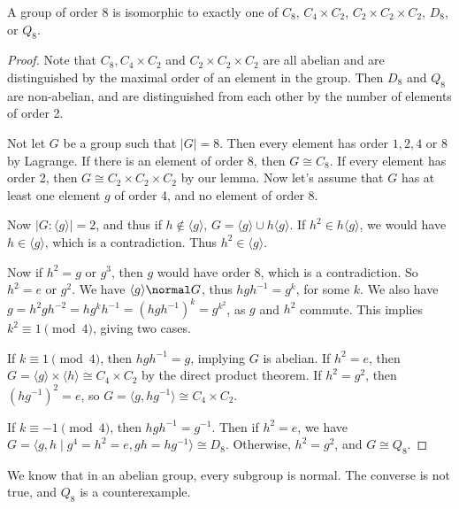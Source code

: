 \documentclass[a4]{scrreprt}
\begin{document}
\begin{theorem}
	A group of order 8 is isomorphic to exactly one of $C_8$, $C_4 \times C_2$, $C_2 \times C_2 \times C_2$, $D_8$, or $Q_8$.
\end{theorem}
\begin{proof}
	Note that $C_8, C_4 \times C_2$ and $C_2 \times C_2 \times C_2$ are all abelian and are distinguished by the maximal order of an element in the group. Then $D_8$ and $Q_8$ are non-abelian, and are distinguished from each other by the number of elements of order 2.

	Not let $G$ be a group such that $|G| = 8$. Then every element has order $1, 2, 4$ or $8$ by Lagrange. If there is an element of order 8, then $G \cong C_8$. If every element has order 2, then $G \cong C_2 \times C_2 \times C_2$ by our lemma. Now let's assume that $G$ has at least one element $g$ of order 4, and no element of order 8.

	Now $|G : \langle g \rangle| = 2$, and thus if $h \not \in \langle g \rangle$, $G = \langle g \rangle \cup h \langle g \rangle$. If $h^2 \in h \langle g \rangle$, we would have $h \in \langle g \rangle$, which is a contradiction. Thus $h^2 \in \langle g \rangle$.

	Now if $h^2 = g$ or $g^3$, then $g$ would have order 8, which is a contradiction. So $h^2 = e$ or $g^2$.
	We have $\langle g \rangle \normal G$, thus $hgh^{-1} = g^k$, for some $k$. We also have $g = h^2 g h^{-2} = h g^{k} h^{-1} = (hgh^{-1})^k = g^{k^2}$, as $g$ and $h^2$ commute. 
	This implies $k^2 \equiv 1 \pmod{4}$, giving two cases.

	If $k \equiv 1 \pmod{4}$, then $hgh^{-1} = g$, implying $G$ is abelian. If $h^2 = e$, then $G = \langle g \rangle \times \langle h \rangle \cong C_4 \times C_2$ by the direct product theorem. If $h^2 = g^2$,  then $(hg^{-1})^2 = e$, so $G = \langle g, hg^{-1} \rangle \cong C_4 \times C_2$.

	If $k \equiv -1 \pmod{4}$, then $hgh^{-1} = g^{-1}$. Then if $h^2 = e$, we have $G = \langle g, h \mid g^4 = h^2 = e, gh = hg^{-1} \rangle \cong D_8$. Otherwise, $h^2 = g^2$, and $G \cong Q_8$.
\end{proof}

\begin{remark}
	We know that in an abelian group, every subgroup is normal. The converse is not true, and $Q_8$ is a counterexample.
\end{remark}

\end{document}
